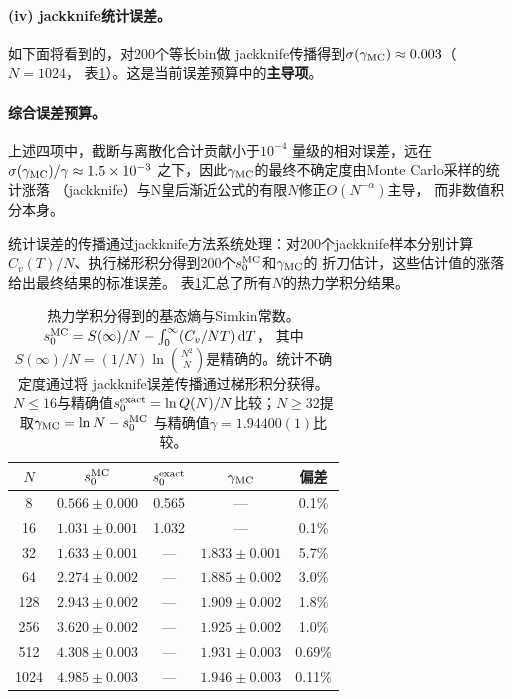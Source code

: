 \paragraph{(iv) jackknife统计误差。}如下面将看到的，对$200$个等长bin做
jackknife传播得到$\sigma(\gamma_{\rm MC})\approx 0.003$（$N=1024$，
表\ref{tab:thermo}）。这是当前误差预算中的\textbf{主导项}。

\paragraph{综合误差预算。}上述四项中，截断与离散化合计贡献小于$10^{-4}$
量级的相对误差，远在$\sigma(\gamma_{\rm MC})/\gamma\approx 1.5\times 10^{-3}$
之下，因此$\gamma_{\rm MC}$的最终不确定度由Monte Carlo采样的统计涨落
（jackknife）与N皇后渐近公式的有限$N$修正$O(N^{-\alpha})$主导，
而非数值积分本身。


统计误差的传播通过jackknife方法系统处理：对200个jackknife样本分别计算
$C_{v}(T)/N$、执行梯形积分得到200个$s_{0}^{\rm MC}$和$\gamma_{\rm MC}$的
折刀估计，这些估计值的涨落给出最终结果的标准误差。
表\ref{tab:thermo}汇总了所有$N$的热力学积分结果。

\begin{table}[htbp]
  \centering
  \caption{热力学积分得到的基态熵与Simkin常数。
  $s_{0}^{\rm MC}=S(\infty)/N-\int_{0}^{\infty}(C_{v}/NT)\,\mathrm{d}T$，
  其中$S(\infty)/N=(1/N)\ln\binom{N^{2}}{N}$是精确的。统计不确定度通过将
  jackknife误差传播通过梯形积分获得。$N\le16$与精确值$s_{0}^{\rm exact}
  =\ln Q(N)/N$比较；$N\ge32$提取$\gamma_{\rm MC}=\ln N-s_{0}^{\rm MC}$
  与精确值$\gamma=1.94400(1)$比较。}
  \label{tab:thermo}
  \begin{tabular}{ccccc}
    \toprule
    $N$ & $s_{0}^{\rm MC}$ & $s_{0}^{\rm exact}$ & $\gamma_{\rm MC}$ & 偏差 \\
    \midrule
    8    & $0.566\pm0.000$  & 0.565  & --- & 0.1\% \\
    16   & $1.031\pm0.001$  & 1.032  & --- & 0.1\% \\
    \midrule
    32   & $1.633\pm0.001$  & --- & $1.833\pm0.001$ & 5.7\% \\
    64   & $2.274\pm0.002$  & --- & $1.885\pm0.002$ & 3.0\% \\
    128  & $2.943\pm0.002$  & --- & $1.909\pm0.002$ & 1.8\% \\
    256  & $3.620\pm0.002$  & --- & $1.925\pm0.002$ & 1.0\% \\
    512  & $4.308\pm0.003$  & --- & $1.931\pm0.003$ & 0.69\% \\
    1024 & $4.985\pm0.003$  & --- & $1.946\pm0.003$ & 0.11\% \\
    \bottomrule
  \end{tabular}
\end{table}

